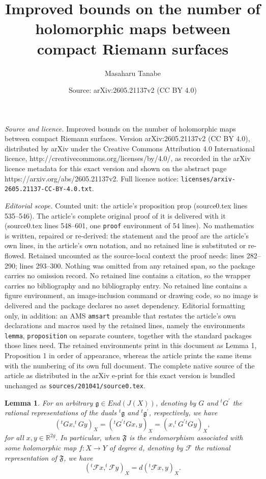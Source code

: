 \documentclass[10pt,a4paper]{amsart}
\title{Improved bounds on the number of holomorphic maps between compact Riemann surfaces}
\author{Masaharu Tanabe}
\date{Source: arXiv:2605.21137v2 (CC BY 4.0)}
\newtheorem{lemma}{Lemma}
\begin{document}
\maketitle

\noindent\emph{Source and licence.} Improved bounds on the number of holomorphic maps between compact Riemann surfaces. Version arXiv:2605.21137v2 (CC BY 4.0), distributed by arXiv under the Creative Commons Attribution 4.0 International licence, http://creativecommons.org/licenses/by/4.0/, as recorded in the arXiv licence metadata for this exact version and shown on the abstract page https://arxiv.org/abs/2605.21137v2. Full licence notice: \texttt{licenses/arxiv-2605.21137-CC-BY-4.0.txt}.\par\smallskip

\noindent\textit{Editorial scope.} Counted unit: the article's proposition prop (source0.tex lines 535--546). The article's complete original proof of it is delivered with it (source0.tex lines 548--601, one \texttt{proof} environment of 54 lines). No mathematics is written, repaired or re-derived: the statement and the proof are the article's own lines, in the article's own notation, and no retained line is substituted or re-flowed.  Retained uncounted as the source-local context the proof needs: lines 282--290; lines 293--300.  Nothing was omitted from any retained span, so the package carries no omission record.  No retained line contains a citation, so the wrapper carries no bibliography and no bibliography entry.  No retained line contains a figure environment, an image-inclusion command or drawing code, so no image is delivered and the package declares no asset dependency.  Editorial formatting only, in addition: an AMS \texttt{amsart} preamble that restates the article's own declarations and macros used by the retained lines, namely the environments \texttt{lemma}, \texttt{proposition} on separate counters, together with the standard packages those lines need.  The retained environments print in this document as Lemma 1, Proposition 1 in order of appearance, whereas the article prints the same items with the numbering of its own full document.  The complete native source of the article as distributed in the arXiv e-print for this exact version is bundled unchanged as \texttt{sources/201041/source0.tex}.
\begin{lemma}\label{lem1} For an arbitrary $\mathfrak{g}\in End(J(X))$, denoting by $G$ and $^{t}G^{\prime}$ the rational representations of the duals $^{t}\mathfrak{g}$ and $^{t}\mathfrak{g^{\prime}}$, respectively, we have
\begin{equation}
(^{t}Gx,^{t}Gy)_{X}=(^{t}G^{\prime}{^{t}Gx},y)_{X}=(x,^{t}G^{\prime}{^{t}Gy})_{X}, 
\end{equation}
for all $x, y\in\mathbb{R}^{2g}.$ In particular, when $\mathfrak{F}$ is the endomorphism associated with some holomorphic map $f:X\rightarrow Y$ of degree $d$, denoting by $\mathcal{F}$ the rational representation of $\mathfrak{F}$, we have
\begin{equation}
(^{t}\mathcal{F}x,^{t}\mathcal{F}y)_{X}=d(^{t}\mathcal{F}x,y)_{X}. 
\end{equation}
\end{lemma}
\end{document}
